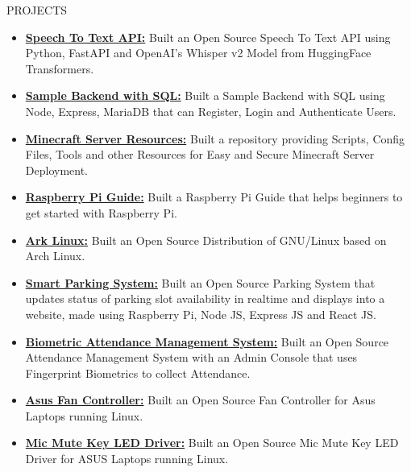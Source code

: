 \documentclass{resume}
\begin{document}
\begin{rSection}{PROJECTS}
\begin{itemize}
    \item \textbf{\href{https://github.com/Arkapravo-Ghosh/speech-to-text}{Speech To Text API:}} {Built an Open Source Speech To Text API using Python, FastAPI and OpenAI's Whisper v2 Model from HuggingFace Transformers.}

    \item \textbf{\href{https://github.com/Arkapravo-Ghosh/sample-backend-with-sql}{Sample Backend with SQL:}} {Built a Sample Backend with SQL using Node, Express, MariaDB that can Register, Login and Authenticate Users.}

    \item \textbf{\href{https://github.com/Arkapravo-Ghosh/minecraft-server-resources}{Minecraft Server Resources:}} {Built a repository providing Scripts, Config Files, Tools and other Resources for Easy and Secure Minecraft Server Deployment.}

    \item \textbf{\href{https://raspberry-pi-guide.ark.ark-tech.in}{Raspberry Pi Guide:}} {Built a Raspberry Pi Guide that helps beginners to get started with Raspberry Pi.}

    \item \textbf{\href{https://github.com/Arkapravo-Ghosh/Ark-Linux}{Ark Linux:}} {Built an Open Source Distribution of GNU/Linux based on Arch Linux.}

    \item \textbf{\href{https://github.com/Arkapravo-Ghosh/Smart-Parking-System}{Smart Parking System:}} {Built an Open Source Parking System that updates status of parking slot availability in realtime and displays into a website, made using Raspberry Pi, Node JS, Express JS and React JS.}

    \item \textbf{\href{https://github.com/Arkapravo-Ghosh/attendance-monitoring-system}{Biometric Attendance Management System:}} {Built an Open Source Attendance Management System with an Admin Console that uses Fingerprint Biometrics to collect Attendance.}

    \item \textbf{\href{https://github.com/Arkapravo-Ghosh/asus-fan-mode}{Asus Fan Controller:}} {Built an Open Source Fan Controller for Asus Laptops running Linux.}

    \item \textbf{\href{https://github.com/Arkapravo-Ghosh/asus-micmute-key-led-driver}{Mic Mute Key LED Driver:}} {Built an Open Source Mic Mute Key LED Driver for ASUS Laptops running Linux.}
\end{itemize}
\end{rSection}
\vspace{0.8em}
\end{document}
